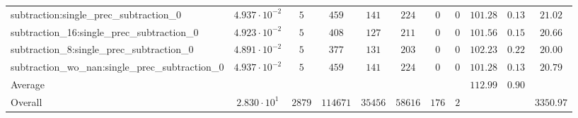 \begin{tabular}{|l|c|c|c|c|c|c|c|c|c|c|}
subtraction:single\_prec\_subtraction\_0                  & $ 4.937 \cdot 10^{-2} $ & $ 5      $ & $ 459    $ & $ 141   $ & $ 224   $ & $ 0   $ & $ 0 $ & $ 101.28      $ & $ 0.13    $ & $ 21.02   $ \\
subtraction\_16:single\_prec\_subtraction\_0              & $ 4.923 \cdot 10^{-2} $ & $ 5      $ & $ 408    $ & $ 127   $ & $ 211   $ & $ 0   $ & $ 0 $ & $ 101.56      $ & $ 0.15    $ & $ 20.66   $ \\
subtraction\_8:single\_prec\_subtraction\_0               & $ 4.891 \cdot 10^{-2} $ & $ 5      $ & $ 377    $ & $ 131   $ & $ 203   $ & $ 0   $ & $ 0 $ & $ 102.23      $ & $ 0.22    $ & $ 20.00   $ \\
subtraction\_wo\_nan:single\_prec\_subtraction\_0         & $ 4.937 \cdot 10^{-2} $ & $ 5      $ & $ 459    $ & $ 141   $ & $ 224   $ & $ 0   $ & $ 0 $ & $ 101.28      $ & $ 0.13    $ & $ 20.79   $ \\
\hline
Average                                                   & $                     $ & $        $ & $        $ & $       $ & $       $ & $     $ & $   $ & $ 112.99      $ & $ 0.90    $ & $         $ \\
\hline
Overall                                                   & $ 2.830 \cdot 10^{1}  $ & $ 2879   $ & $ 114671 $ & $ 35456 $ & $ 58616 $ & $ 176 $ & $ 2 $ & $             $ & $         $ & $ 3350.97 $ \\
\hline
\end{tabular}
